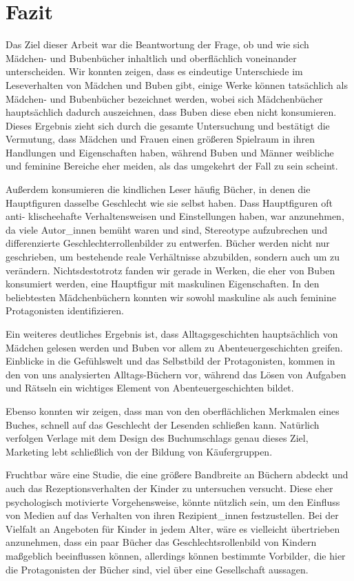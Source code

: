 \chapter{Fazit}

Das Ziel dieser Arbeit war die Beantwortung der Frage, ob und wie sich
Mädchen- und Bubenbücher inhaltlich und oberflächlich voneinander
unterscheiden. Wir konnten zeigen, dass es eindeutige Unterschiede im
Leseverhalten von Mädchen und Buben gibt, einige Werke können
tatsächlich als Mädchen- und Bubenbücher bezeichnet werden, wobei sich
Mädchenbücher hauptsächlich dadurch auszeichnen, dass Buben diese eben
nicht konsumieren. Dieses Ergebnis zieht sich durch die gesamte
Untersuchung und bestätigt die Vermutung, dass Mädchen und Frauen einen
größeren Spielraum in ihren Handlungen und Eigenschaften haben, während
Buben und Männer weibliche und feminine Bereiche eher meiden, als das
umgekehrt der Fall zu sein scheint.

Außerdem konsumieren die kindlichen Leser häufig Bücher, in denen die
Hauptfiguren dasselbe Geschlecht wie sie selbst haben. Dass Hauptfiguren
oft anti- klischeehafte Verhaltensweisen und Einstellungen haben, war
anzunehmen, da viele Autor\_innen bemüht waren und sind, Stereotype
aufzubrechen und differenzierte Geschlechterrollenbilder zu entwerfen.
Bücher werden nicht nur geschrieben, um bestehende reale Verhältnisse
abzubilden, sondern auch um zu verändern. Nichtsdestotrotz fanden wir
gerade in Werken, die eher von Buben konsumiert werden, eine Hauptfigur
mit maskulinen Eigenschaften. In den beliebtesten Mädchenbüchern konnten
wir sowohl maskuline als auch feminine Protagonisten identifizieren.

Ein weiteres deutliches Ergebnis ist, dass Alltagsgeschichten
hauptsächlich von Mädchen gelesen werden und Buben vor allem zu
Abenteuergeschichten greifen. Einblicke in die Gefühlswelt und das
Selbstbild der Protagonisten, kommen in den von uns analysierten
Alltags-Büchern vor, während das Lösen von Aufgaben und Rätseln ein
wichtiges Element von Abenteuergeschichten bildet.

Ebenso konnten wir zeigen, dass man von den oberflächlichen Merkmalen
eines Buches, schnell auf das Geschlecht der Lesenden schließen kann.
Natürlich verfolgen Verlage mit dem Design des Buchumschlags genau
dieses Ziel, Marketing lebt schließlich von der Bildung von
Käufergruppen.

Fruchtbar wäre eine Studie, die eine größere Bandbreite an Büchern
abdeckt und auch das Rezeptionsverhalten der Kinder zu untersuchen
versucht. Diese eher psychologisch motivierte Vorgehensweise, könnte
nützlich sein, um den Einfluss von Medien auf das Verhalten von ihren
Rezipient\_innen festzustellen. Bei der Vielfalt an Angeboten für Kinder
in jedem Alter, wäre es vielleicht übertrieben anzunehmen, dass ein paar
Bücher das Geschlechtsrollenbild von Kindern maßgeblich beeinflussen
können, allerdings können bestimmte Vorbilder, die hier die
Protagonisten der Bücher sind, viel über eine Gesellschaft aussagen.
